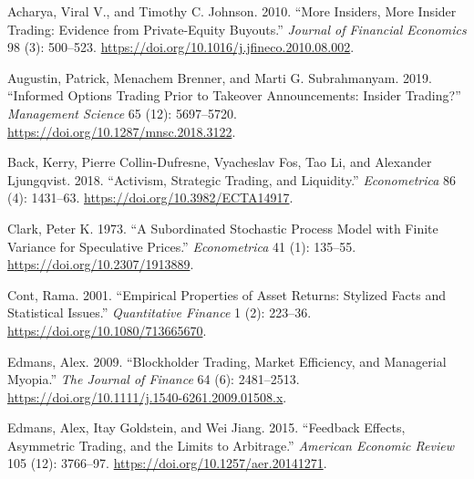 
Acharya, Viral V., and Timothy C. Johnson. 2010. {``More Insiders, More
Insider Trading: Evidence from Private-Equity Buyouts.''}
\emph{Journal of Financial Economics} 98 (3): 500--523.
\url{https://doi.org/10.1016/j.jfineco.2010.08.002}.

Augustin, Patrick, Menachem Brenner, and Marti G. Subrahmanyam. 2019.
{``Informed Options Trading Prior to Takeover Announcements: Insider
Trading?''} \emph{Management Science} 65 (12): 5697--5720.
\url{https://doi.org/10.1287/mnsc.2018.3122}.

Back, Kerry, Pierre Collin-Dufresne, Vyacheslav Fos, Tao Li, and
Alexander Ljungqvist. 2018. {``Activism, Strategic Trading, and
Liquidity.''} \emph{Econometrica} 86 (4): 1431--63.
\url{https://doi.org/10.3982/ECTA14917}.

Clark, Peter K. 1973. {``A Subordinated Stochastic Process Model with
Finite Variance for Speculative Prices.''} \emph{Econometrica} 41 (1):
135--55. \url{https://doi.org/10.2307/1913889}.

Cont, Rama. 2001. {``Empirical Properties of Asset Returns: Stylized
Facts and Statistical Issues.''} \emph{Quantitative Finance} 1 (2):
223--36. \url{https://doi.org/10.1080/713665670}.

Edmans, Alex. 2009. {``Blockholder Trading, Market Efficiency, and
Managerial Myopia.''} \emph{The Journal of Finance} 64 (6): 2481--2513.
\url{https://doi.org/10.1111/j.1540-6261.2009.01508.x}.

Edmans, Alex, Itay Goldstein, and Wei Jiang. 2015. {``Feedback Effects,
Asymmetric Trading, and the Limits to Arbitrage.''} \emph{American
Economic Review} 105 (12): 3766--97.
\url{https://doi.org/10.1257/aer.20141271}.

